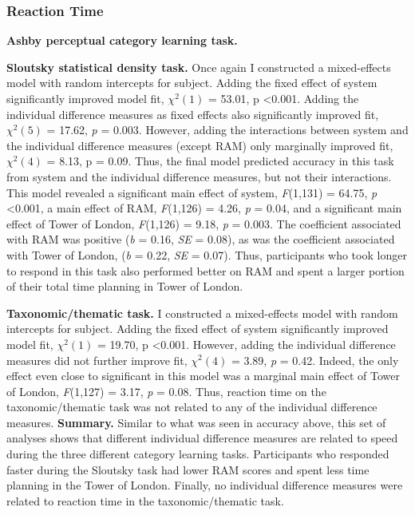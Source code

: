 \documentclass[../dissertation.tex]{subfiles}
\begin{document}
\subsubsection{Reaction Time}

\textbf{Ashby perceptual category learning task.} \par 
\textbf{Sloutsky statistical density task.}  Once again I constructed a mixed-effects model with random intercepts for subject. Adding the fixed effect of system significantly improved model fit,  $\chi^{2}(1)$ = 53.01, p \textless 0.001. Adding the individual difference measures as fixed effects also significantly improved fit, $\chi^{2}(5)$  = 17.62, \textit{p} = 0.003. However, adding the interactions between system and the individual difference measures (except RAM) only marginally improved fit,  $\chi^{2}(4)$ = 8.13, p = 0.09. Thus, the final model predicted accuracy in this task from system and the individual difference measures, but not their interactions. This model revealed a significant main effect of system, \textit{F}(1,131) = 64.75, \textit{p} \textless 0.001, a main effect of RAM, \textit{F}(1,126) = 4.26, \textit{p} = 0.04, and a significant main effect of Tower of London, \textit{F}(1,126) = 9.18, \textit{p} = 0.003. The coefficient associated with RAM was positive (\textit{b} = 0.16, \textit{SE} = 0.08), as was the coefficient associated with Tower of London, (\textit{b} = 0.22, \textit{SE} = 0.07). Thus, participants who took longer to respond in this task also performed better on RAM and spent a larger portion of their total time planning in Tower of London. \par
\textbf{Taxonomic/thematic task.}  I constructed a mixed-effects model with random intercepts for subject. Adding the fixed effect of system significantly improved model fit,  $\chi^{2}(1)$ = 19.70, p \textless 0.001. However, adding the individual difference measures did not further improve fit,  $\chi^{2}(4)$ = 3.89, \textit{p} = 0.42. Indeed, the only effect even close to significant in this model was a marginal main effect of Tower of London, \textit{F}(1,127) = 3.17, \textit{p} = 0.08. Thus, reaction time on the taxonomic/thematic task was not related to any of the individual difference measures.
\textbf{Summary.} Similar to what was seen in accuracy above, this set of analyses shows that different individual difference measures are related to speed during the three different category learning tasks. Participants who responded faster during the Sloutsky task had lower RAM scores and spent less time planning in the Tower of London. Finally, no individual difference measures were related to reaction time in the taxonomic/thematic task.
\end{document}
